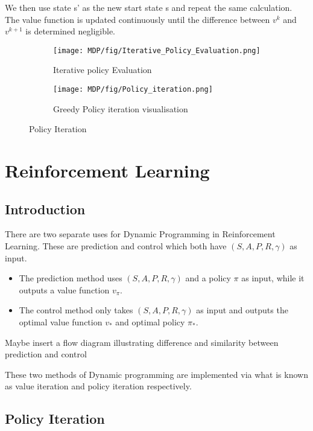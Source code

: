 We then use state s' as the new start state s and repeat the same calculation.
The value function is updated continuously until the difference between $v^{k}$ and $v^{k+1}$ is determined negligible.

\begin{figure}
	\centering
	\begin{subfigure}{.49\textwidth}
		\centering
		\texttt{[image: MDP/fig/Iterative\_Policy\_Evaluation.png]}
		\caption{Iterative policy Evaluation\cite{David_Silver}}
		\label{fig:iterative_policy_evaluation}
	\end{subfigure}
	\begin{subfigure}{.49\textwidth}
		\centering
		\texttt{[image: MDP/fig/Policy\_iteration.png]}
		\caption{Greedy Policy iteration visualisation\cite{David_Silver}}
		\label{fig:greedy_policy_iteration}
	\end{subfigure}
	\caption{Policy Iteration \cite{David_Silver}}
	\label{fig:policy_iteration}
\end{figure}
\section{Reinforcement Learning}
\subsection{Introduction}
There are two separate uses for Dynamic Programming in Reinforcement Learning. These are prediction and control which both have $(S,A,P,R,\gamma)$ as input.
\begin{itemize}
	\item The prediction method uses $(S,A,P,R,\gamma)$ and a policy $\pi$ as input, while it outputs a value function $v_\pi$.
	\item The control method only takes $(S,A,P,R,\gamma)$ as input and outputs the optimal value function $v_*$ and optimal policy $\pi_{*}$.
\end{itemize}
{\color{red} Maybe insert a flow diagram illustrating difference and similarity between prediction and control }

These two methods of Dynamic programming are implemented via what is known as value iteration and policy iteration respectively.

\subsection{Policy Iteration}


